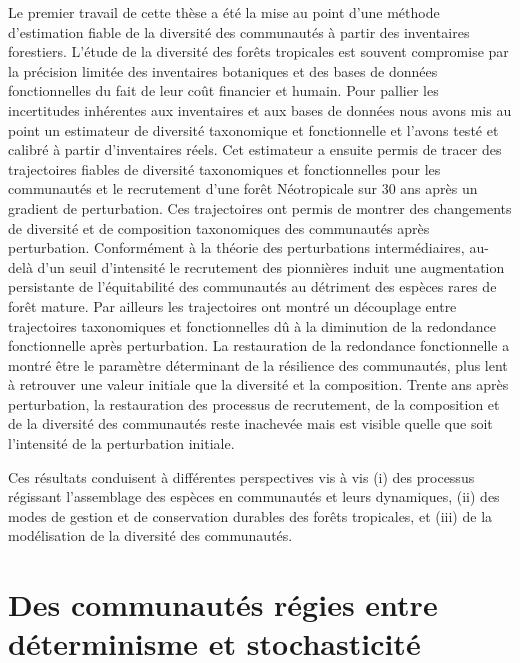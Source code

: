 \documentclass[
  11pt,
  french,
  A4paper,
  extrafontsizes,onecolumn,openright
  ]{memoir}
\begin{document}
Le premier travail de cette thèse a été la mise au point d'une méthode
d'estimation fiable de la diversité des communautés à partir des
inventaires forestiers. L'étude de la diversité des forêts tropicales
est souvent compromise par la précision limitée des inventaires
botaniques et des bases de données fonctionnelles du fait de leur coût
financier et humain. Pour pallier les incertitudes inhérentes aux
inventaires et aux bases de données nous avons mis au point un
estimateur de diversité taxonomique et fonctionnelle et l'avons testé et
calibré à partir d'inventaires réels. Cet estimateur a ensuite permis de
tracer des trajectoires fiables de diversité taxonomiques et
fonctionnelles pour les communautés et le recrutement d'une forêt
Néotropicale sur 30 ans après un gradient de perturbation. Ces
trajectoires ont permis de montrer des changements de diversité et de
composition taxonomiques des communautés après perturbation.
Conformément à la théorie des perturbations intermédiaires, au-delà d'un
seuil d'intensité le recrutement des pionnières induit une augmentation
persistante de l'équitabilité des communautés au détriment des espèces
rares de forêt mature. Par ailleurs les trajectoires ont montré un
découplage entre trajectoires taxonomiques et fonctionnelles dû à la
diminution de la redondance fonctionnelle après perturbation. La
restauration de la redondance fonctionnelle a montré être le paramètre
déterminant de la résilience des communautés, plus lent à retrouver une
valeur initiale que la diversité et la composition. Trente ans après
perturbation, la restauration des processus de recrutement, de la
composition et de la diversité des communautés reste inachevée mais est
visible quelle que soit l'intensité de la perturbation initiale.

Ces résultats conduisent à différentes perspectives vis à vis (i) des
processus régissant l'assemblage des espèces en communautés et leurs
dynamiques, (ii) des modes de gestion et de conservation durables des
forêts tropicales, et (iii) de la modélisation de la diversité des
communautés.

\section{Des communautés régies entre déterminisme et
stochasticité}\label{des-communautes-regies-entre-determinisme-et-stochasticite}
\end{document}
